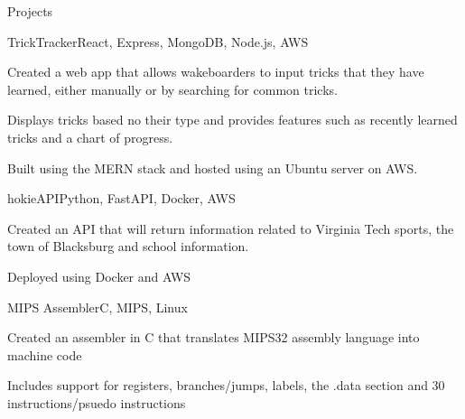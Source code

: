 \documentclass{resume} %
\begin{document}
\begin{rSection}{Projects}

\begin{rSubsection}{TrickTracker}{React, Express, MongoDB, Node.js, AWS}{}{}
\item Created a web app that allows wakeboarders to input tricks that they have learned, either manually or by searching for common tricks.
\item Displays tricks based no their type and provides features such as recently
learned tricks and a chart of progress.
\item Built using the MERN stack and hosted using an Ubuntu server on AWS.
\end{rSubsection}


\begin{rSubsection}{hokieAPI}{Python, FastAPI, Docker, AWS}{}{}
\item Created an API that will return information related to Virginia Tech sports, the town of Blacksburg and school information. 
\item Deployed using Docker and AWS
\end{rSubsection}


\begin{rSubsection}{MIPS Assembler}{C, MIPS, Linux}{}{}
\item Created an assembler in C that translates MIPS32 assembly language into machine code
\item Includes support for registers, branches/jumps, labels, the .data section and 30 instructions/psuedo instructions
\end{rSubsection}

\end{rSection}
\end{document}
